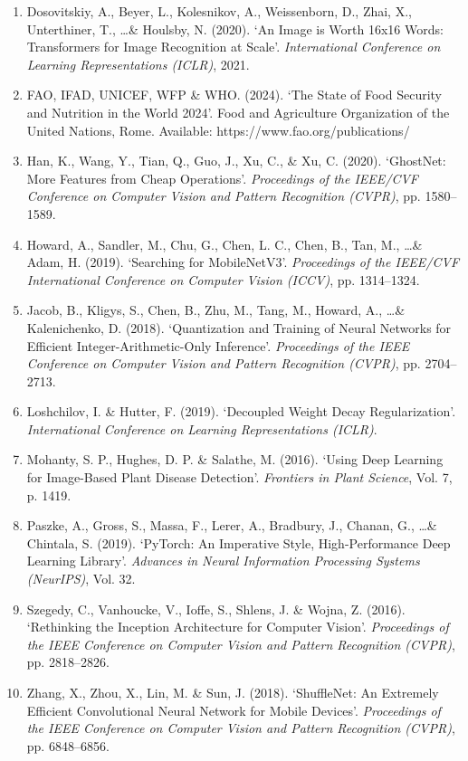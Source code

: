 \documentclass[12pt,oneside]{report}
\begin{document}
\begin{enumerate}[leftmargin=*]
    \item Dosovitskiy, A., Beyer, L., Kolesnikov, A., Weissenborn, D., Zhai, X., Unterthiner, T., \ldots \& Houlsby, N. (2020). `An Image is Worth 16x16 Words: Transformers for Image Recognition at Scale'. \textit{International Conference on Learning Representations (ICLR)}, 2021.

    \item FAO, IFAD, UNICEF, WFP \& WHO. (2024). `The State of Food Security and Nutrition in the World 2024'. Food and Agriculture Organization of the United Nations, Rome. Available: https://www.fao.org/publications/

    \item Han, K., Wang, Y., Tian, Q., Guo, J., Xu, C., \& Xu, C. (2020). `GhostNet: More Features from Cheap Operations'. \textit{Proceedings of the IEEE/CVF Conference on Computer Vision and Pattern Recognition (CVPR)}, pp. 1580–1589.

    \item Howard, A., Sandler, M., Chu, G., Chen, L. C., Chen, B., Tan, M., \ldots \& Adam, H. (2019). `Searching for MobileNetV3'. \textit{Proceedings of the IEEE/CVF International Conference on Computer Vision (ICCV)}, pp. 1314–1324.

    \item Jacob, B., Kligys, S., Chen, B., Zhu, M., Tang, M., Howard, A., \ldots \& Kalenichenko, D. (2018). `Quantization and Training of Neural Networks for Efficient Integer-Arithmetic-Only Inference'. \textit{Proceedings of the IEEE Conference on Computer Vision and Pattern Recognition (CVPR)}, pp. 2704–2713.

    \item Loshchilov, I. \& Hutter, F. (2019). `Decoupled Weight Decay Regularization'. \textit{International Conference on Learning Representations (ICLR)}.

    \item Mohanty, S. P., Hughes, D. P. \& Salathe, M. (2016). `Using Deep Learning for Image-Based Plant Disease Detection'. \textit{Frontiers in Plant Science}, Vol. 7, p. 1419.

    \item Paszke, A., Gross, S., Massa, F., Lerer, A., Bradbury, J., Chanan, G., \ldots \& Chintala, S. (2019). `PyTorch: An Imperative Style, High-Performance Deep Learning Library'. \textit{Advances in Neural Information Processing Systems (NeurIPS)}, Vol. 32.

    \item Szegedy, C., Vanhoucke, V., Ioffe, S., Shlens, J. \& Wojna, Z. (2016). `Rethinking the Inception Architecture for Computer Vision'. \textit{Proceedings of the IEEE Conference on Computer Vision and Pattern Recognition (CVPR)}, pp. 2818–2826.

    \item Zhang, X., Zhou, X., Lin, M. \& Sun, J. (2018). `ShuffleNet: An Extremely Efficient Convolutional Neural Network for Mobile Devices'. \textit{Proceedings of the IEEE Conference on Computer Vision and Pattern Recognition (CVPR)}, pp. 6848–6856.
\end{enumerate}
\end{document}
